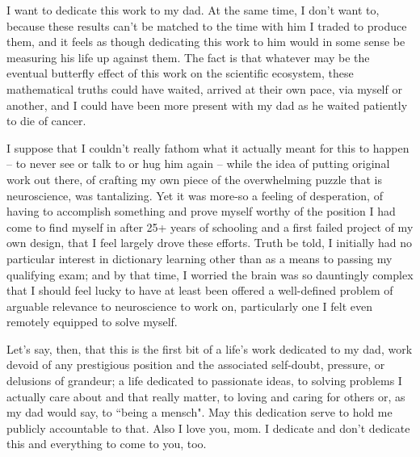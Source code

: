 \documentclass{ucbthesis}
\begin{document}
\begin{frontmatter}

\begin{dedication}
\null\vfil
I want to dedicate this work to my dad. At the same time, I don't want to, because these results can't be matched to the time with him I traded to produce them, and it feels as though dedicating this work to him would in some sense be measuring his life up against them. The fact is that whatever may be the eventual butterfly effect of this work on the scientific ecosystem, these mathematical truths could have waited, arrived at their own pace, via myself or another, and I could have been more present with my dad as he waited patiently to die of cancer. 

I suppose that I couldn't really fathom what it actually meant for this to happen -- to never see or talk to or hug him again -- while the idea of putting original work out there, of crafting my own piece of the overwhelming puzzle that is neuroscience, was tantalizing. Yet it was more-so a feeling of desperation, of having to accomplish something and prove myself worthy of the position I had come to find myself in after 25+ years of schooling and a first failed project of my own design, that I feel largely drove these efforts. Truth be told, I initially had no particular interest in dictionary learning other than as a means to passing my qualifying exam; and by that time, I worried the brain was so dauntingly complex that I should feel lucky to have at least been offered a well-defined problem of arguable relevance to neuroscience to work on, particularly one I felt even remotely equipped to solve myself.

Let's say, then, that this is the first bit of a life's work dedicated to my dad, work devoid of any prestigious position and the associated self-doubt, pressure, or delusions of grandeur; a life dedicated to passionate ideas, to solving problems I actually care about and that really matter, to loving and caring for others or, as my dad would say, to ``being a mensch". May this dedication serve to hold me publicly accountable to that. Also I love you, mom. I dedicate and don't dedicate this and everything to come to you, too.

\vspace{12pt}
\vfil\null
\end{dedication}



\end{frontmatter}
\end{document}
